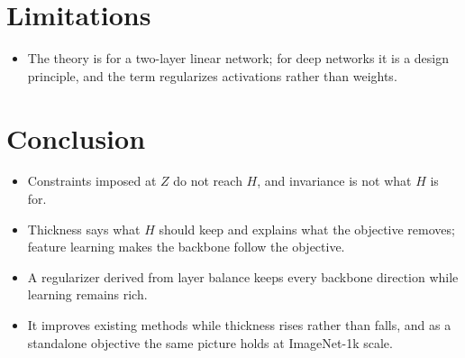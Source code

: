 \documentclass[11pt]{article}
\numberwithin{equation}{section}
\theoremstyle{definition}
\theoremstyle{remark}
\begin{document}
\section{Limitations}
\begin{itemize}
    \item The theory is for a two-layer linear network; for deep networks it is a design
    principle, and the term regularizes activations rather than weights.
\end{itemize}


\section{Conclusion}
\begin{itemize}
    \item Constraints imposed at \(Z\) do not reach \(H\), and invariance is not what
    \(H\) is for.
    \item Thickness says what \(H\) should keep and explains what the objective removes;
    feature learning makes the backbone follow the objective.
    \item A regularizer derived from layer balance keeps every backbone direction while
    learning remains rich.
    \item It improves existing methods while thickness rises rather than falls, and as a
    standalone objective the same picture holds at ImageNet-1k scale.
\end{itemize}

\end{document}
